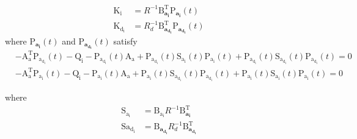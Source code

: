 \documentclass[3p,times]{elsarticle}
\begin{document}
\begin{align}
	\boldsymbol{{\mathrm{K_i}}} &= {{{R}}^{-1}}\boldsymbol{{\mathrm{B}_{a_i}^\mathrm{T}}}\boldsymbol{{\mathrm{P}}_{a_i}}(t)\\
	\boldsymbol{{\mathrm{K_{d_i}}}} &= {{{R}}^{-1}_{d}}\boldsymbol{{\mathrm{B}_{a_{d_i}}^\mathrm{T}}}\boldsymbol{{\mathrm{P}}_{a_{d_i}}}(t)
\end{align}
where $\boldsymbol{{\mathrm{P}}_{a_i}}(t)$ and $\boldsymbol{{\mathrm{P}}_{a_{d_i}}}(t)$ satisfy
\begin{align}\label{coupled_riccatti_LQIDG}
	&-\boldsymbol{\mathrm{A^\mathrm{T}_a}}\boldsymbol{\mathrm{P_{a_{d_i}}}}(t) - \boldsymbol{\mathrm{Q_{i}}} - \boldsymbol{\mathrm{P_{a_{d_i}}}}(t)\boldsymbol{\mathrm{A_a}} + \boldsymbol{\mathrm{P_{a_{d_i}}}}(t)\boldsymbol{\mathrm{S_{a_i}}}(t)\boldsymbol{\mathrm{P_{a_i}}}(t) +\boldsymbol{\mathrm{P_{a_{d_i}}}}(t)\boldsymbol{\mathrm{S_{a_{d_i}}}}(t)\boldsymbol{\mathrm{P_{a_{d_i}}}}(t)
	=\boldsymbol{\mathrm{0}}\\
            &-\boldsymbol{\mathrm{A^\mathrm{T}_a}}\boldsymbol{\mathrm{P_{a_i}}}(t) - \boldsymbol{\mathrm{Q_i}} - \boldsymbol{\mathrm{P_{a_i}}}(t)\boldsymbol{\mathrm{A_a}}  + \boldsymbol{\mathrm{P_{a_i}}}(t)\boldsymbol{\mathrm{S_{a_{d_i}}}}(t)\boldsymbol{\mathrm{P_{a_{d_i}}}}(t) +\boldsymbol{\mathrm{P_{a_i}}}(t)\boldsymbol{\mathrm{S_{a_i}}}(t)\boldsymbol{\mathrm{P_{a_i}}}(t) =\boldsymbol{\mathrm{0}}
\end{align}

where
\begin{align}
	\boldsymbol{\mathrm{S_{a_i}}} &= \boldsymbol{\mathrm{B_{a_i}}}R^{-1}\boldsymbol{\mathrm{B}^\mathrm{T}_{a_i}}\\
	\boldsymbol{\mathrm{S{a_{d_i}}}} &= \boldsymbol{\mathrm{B}_{a_{d_i}}}R_{d}^{-1}\boldsymbol{\mathrm{B}^\mathrm{T}_{a_{d_i}}}
\end{align}
\end{document}
